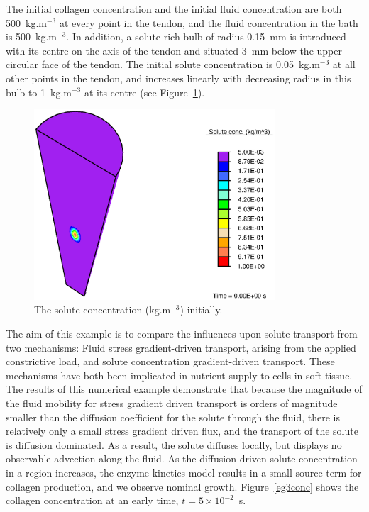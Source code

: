 The initial collagen concentration and the initial fluid concentration
are both 500~kg.m$^{-3}$ at every point in the tendon, and the fluid
concentration in the bath is 500~kg.m$^{-3}$. In addition, a
solute-rich bulb of radius 0.15~mm is introduced with its centre on
the axis of the tendon and situated 3~mm below the upper circular face
of the tendon. The initial solute concentration is 0.05~kg.m$^{-3}$ at
all other points in the tendon, and increases linearly with decreasing
radius in this bulb to 1~kg.m$^{-3}$ at its centre (see
Figure~\ref{eg3ini}).

\begin{figure}[!hpt]
\centering
\includegraphics[width=0.8\textwidth]{images/examples/lagrangian/medication/initial-solute-concentration}
\caption{The solute concentration (kg.m$^{-3}$) initially.}
\label{eg3ini}
\end{figure}

The aim of this example is to compare the influences upon solute
transport from two mechanisms: Fluid stress gradient-driven transport,
arising from the applied constrictive load, and solute concentration
gradient-driven transport. These mechanisms have both been implicated
in nutrient supply to cells in soft tissue. The results of this
numerical example demonstrate that because the magnitude of the fluid mobility
for stress gradient driven transport is orders of magnitude
smaller than the diffusion coefficient for the solute through the
fluid, there is relatively only a small stress gradient driven flux,
and the transport of the solute is diffusion dominated. As a result,
the solute diffuses locally, but displays no
observable advection along the fluid. As the diffusion-driven solute
concentration in a region increases, the enzyme-kinetics model
results in a small source term for collagen production, and we observe nominal
growth. Figure~\ref{eg3conc} shows the collagen concentration at an
early time, $t=5\times10^{-2}$~s.

